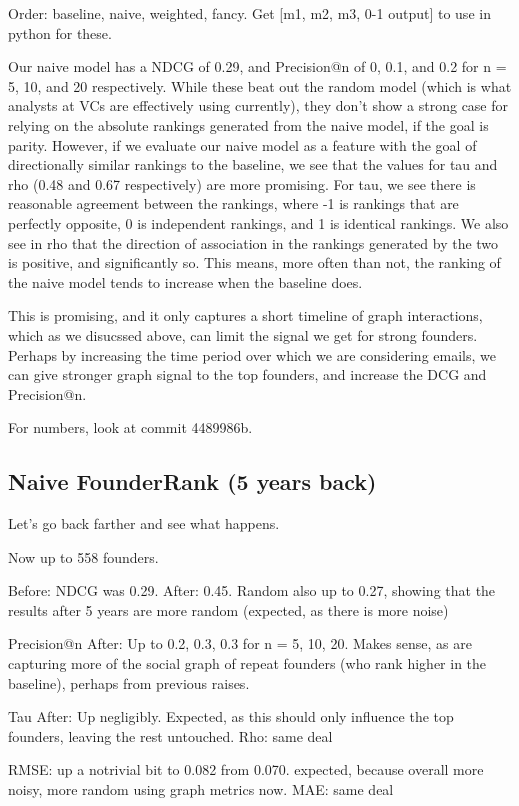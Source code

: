 Order: baseline, naive, weighted, fancy.
Get [m1, m2, m3, 0-1 output] to use in python for these.

Our naive model has a NDCG of 0.29, and Precision@n of 0, 0.1, and 0.2 for n = 5, 10, and 20 respectively. While these beat out the random model (which is what analysts at VCs are effectively using currently), they don't show a strong case for relying on the absolute rankings generated from the naive model, if the goal is parity. However, if we evaluate our naive model as a feature with the goal of directionally similar rankings to the baseline, we see that the values for tau and rho (0.48 and 0.67 respectively) are more promising. For tau, we see there is reasonable agreement between the rankings, where -1 is rankings that are perfectly opposite, 0 is independent rankings, and 1 is identical rankings. We also see in rho that the direction of association in the rankings generated by the two is positive, and significantly so. This means, more often than not, the ranking of the naive model tends to increase when the baseline does.

This is promising, and it only captures a short timeline of graph interactions, which as we disucssed above, can limit the signal we get for strong founders. Perhaps by increasing the time period over which we are considering emails, we can give stronger graph signal to the top founders, and increase the DCG and Precision@n.

For numbers, look at commit 4489986b.

\subsection{Naive FounderRank (5 years back)}

Let's go back farther and see what happens.

Now up to 558 founders.

Before: NDCG was 0.29.
After: 0.45. Random also up to 0.27, showing that the results after 5 years are more random (expected, as there is more noise)

Precision@n After: Up to 0.2, 0.3, 0.3 for n = 5, 10, 20. Makes sense, as are capturing more of the social graph of repeat founders (who rank higher in the baseline), perhaps from previous raises.

Tau After: Up negligibly. Expected, as this should only influence the top founders, leaving the rest untouched.
Rho: same deal

RMSE: up a notrivial bit to 0.082 from 0.070. expected, because overall more noisy, more random using graph metrics now.
MAE: same deal


